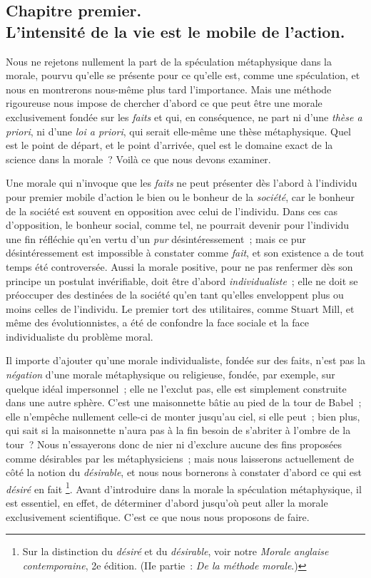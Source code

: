 \documentclass[french,twoside]{book} %
\begin{document}
\subsection[{Chapitre premier. L’intensité de la vie est le mobile de l’action.}]{Chapitre premier. \\
L’intensité de la vie est le mobile de l’action.}
\noindent Nous ne rejetons nullement la part de la spéculation métaphysique dans la morale, pourvu qu’elle se présente pour ce qu’elle est, comme une spéculation, et nous en montrerons nous-même plus tard l’importance. Mais une méthode rigoureuse nous impose de chercher d’abord ce que peut être une morale exclusivement fondée sur les \emph{faits} et qui, en conséquence, ne part ni d’une \emph{thèse a priori}, ni d’une \emph{loi a priori}, qui serait elle-même une thèse métaphysique. Quel est le point de départ, et le point d’arrivée, quel est le domaine exact de la science dans la morale ? Voilà ce que nous devons examiner.\par
Une morale qui n’invoque que les \emph{faits} ne peut présenter dès l’abord à l’individu pour premier mobile d’action le bien ou le bonheur de la \emph{société}, car le bonheur de la société est souvent en opposition avec celui de l’individu. Dans ces cas d’opposition, le bonheur social, comme tel, ne pourrait devenir pour l’individu une fin réfléchie qu’en vertu d’un \emph{pur} désintéressement ; mais ce pur désintéressement est impossible à constater comme \emph{fait}, et son existence a de tout temps été controversée. Aussi la morale positive, pour ne pas renfermer dès son principe un postulat invérifiable, doit être d’abord \emph{individualiste} ; elle ne doit se préoccuper des destinées de la société qu’en tant qu’elles enveloppent plus ou moins celles de l’individu. Le premier tort des utilitaires, comme Stuart Mill, et même des évolutionnistes, a été de confondre la face sociale et la face individualiste du problème moral.\par
Il importe d’ajouter qu’une morale individualiste, fondée sur des faits, n’est pas la \emph{négation} d’une morale métaphysique ou religieuse, fondée, par exemple, sur quelque idéal impersonnel ; elle ne l’exclut pas, elle est simplement construite dans une autre sphère. C’est une maisonnette bâtie au pied de la tour de Babel ; elle n’empêche nullement celle-ci de monter jusqu’au ciel, si elle peut ; bien plus, qui sait si la maisonnette n’aura pas à la fin besoin de s’abriter à l’ombre de la tour ? Nous n’essayerons donc de nier ni d’exclure aucune des fins proposées comme désirables par les métaphysiciens ; mais nous laisserons actuellement de côté la notion du \emph{désirable}, et nous nous bornerons à constater d’abord ce qui est \emph{désiré} en fait \footnote{Sur la distinction du \emph{désiré} et du \emph{désirable}, voir notre \emph{Morale anglaise contemporaine}, 2e édition. (IIe partie : \emph{De la méthode morale}.)}. Avant d’introduire dans la morale la spéculation métaphysique, il est essentiel, en effet, de déterminer d’abord jusqu’où peut aller la morale exclusivement scientifique. C’est ce que nous nous proposons de faire.\par
\end{document}
